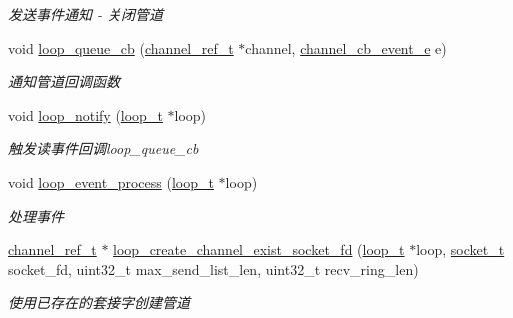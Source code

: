 \begin{DoxyCompactItemize}
\begin{DoxyCompactList}\small\item\em 发送事件通知 -\/ 关闭管道 \end{DoxyCompactList}\item 
void \hyperlink{a00052_a970d2bf2e65270fe3d93de1e22a4d34c_a970d2bf2e65270fe3d93de1e22a4d34c}{loop\+\_\+queue\+\_\+cb} (\hyperlink{a00044_a151271c9d188ef28d4d24bb81dcc1263_a151271c9d188ef28d4d24bb81dcc1263}{channel\+\_\+ref\+\_\+t} $\ast$channel, \hyperlink{a00044_aaf2cba5d4035f3d56350b59342ebf65c_aaf2cba5d4035f3d56350b59342ebf65c}{channel\+\_\+cb\+\_\+event\+\_\+e} e)
\begin{DoxyCompactList}\small\item\em 通知管道回调函数 \end{DoxyCompactList}\item 
void \hyperlink{a00052_a3857990b0f1f9e27e000b5924b88a958_a3857990b0f1f9e27e000b5924b88a958}{loop\+\_\+notify} (\hyperlink{a00044_a9c3ad1cd2de83e09f3a7b59fa82c94ee_a9c3ad1cd2de83e09f3a7b59fa82c94ee}{loop\+\_\+t} $\ast$loop)
\begin{DoxyCompactList}\small\item\em 触发读事件回调loop\+\_\+queue\+\_\+cb \end{DoxyCompactList}\item 
void \hyperlink{a00052_a94a2dfa4ba7723d7face3f76ebf31e54_a94a2dfa4ba7723d7face3f76ebf31e54}{loop\+\_\+event\+\_\+process} (\hyperlink{a00044_a9c3ad1cd2de83e09f3a7b59fa82c94ee_a9c3ad1cd2de83e09f3a7b59fa82c94ee}{loop\+\_\+t} $\ast$loop)
\begin{DoxyCompactList}\small\item\em 处理事件 \end{DoxyCompactList}\item 
\hyperlink{a00044_a151271c9d188ef28d4d24bb81dcc1263_a151271c9d188ef28d4d24bb81dcc1263}{channel\+\_\+ref\+\_\+t} $\ast$ \hyperlink{a00085_ga6879ac453ef83768ce8f8ef43a474409_ga6879ac453ef83768ce8f8ef43a474409}{loop\+\_\+create\+\_\+channel\+\_\+exist\+\_\+socket\+\_\+fd} (\hyperlink{a00044_a9c3ad1cd2de83e09f3a7b59fa82c94ee_a9c3ad1cd2de83e09f3a7b59fa82c94ee}{loop\+\_\+t} $\ast$loop, \hyperlink{a00044_a0d9e0afbf02fb6ed6c5b1415dce51b05_a0d9e0afbf02fb6ed6c5b1415dce51b05}{socket\+\_\+t} socket\+\_\+fd, uint32\+\_\+t max\+\_\+send\+\_\+list\+\_\+len, uint32\+\_\+t recv\+\_\+ring\+\_\+len)
\begin{DoxyCompactList}\small\item\em 使用已存在的套接字创建管道 \end{DoxyCompactList}\item 

\end{DoxyCompactItemize}
